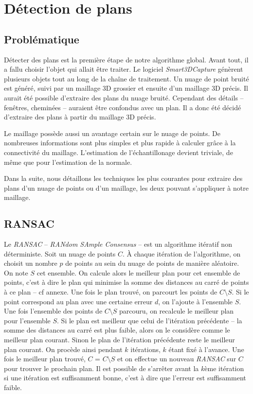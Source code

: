 \documentclass[12pt, twoside]{article}
\let\oldsection\section
\def\section{\cleardoublepage\oldsection}
\begin{document}
\section{Détection de plans}
\subsection{Problématique}
Détecter des plans est la première étape de notre algorithme global. Avant tout, il a fallu choisir l'objet qui allait être traiter. Le logiciel \textit{Smart3DCapture} génèrent plusieurs objets tout au long de la chaîne de traitement. Un nuage de point bruité est généré, suivi par un maillage 3D grossier et ensuite d'un maillage 3D précis. Il aurait été possible d'extraire des plans du nuage bruité. Cependant des détails -- fenêtres, cheminées -- auraient être confondus avec un plan. Il a donc été décidé d'extraire des plans à partir du maillage 3D précis.

Le maillage possède aussi un avantage certain sur le nuage de points. De nombreuses informations sont plus simples et plus rapide à calculer grâce à la connectivité du maillage. L'estimation de l'échantillonage devient triviale, de même que pour l'estimation de la normale.

Dans la suite, nous détaillons les techniques les plus courantes pour extraire des plans d'un nuage de points ou d'un maillage, les deux pouvant s'appliquer à notre maillage.

\subsection{RANSAC}
Le \textit{RANSAC} -- \textit{RANdom SAmple Consensus} -- est un algorithme itératif non déterministe. Soit un nuage de points $C$. À chaque itération de l’algorithme, on choisit un nombre $p$ de points au sein du nuage de points de manière aléatoire. On note $S$ cet ensemble. On calcule alors le meilleur plan pour cet ensemble de points, c’est à dire le plan qui minimise la somme des distances au carré de points à ce plan -- cf annexe. Une fois le plan trouvé, on parcourt les points de $C\setminus S$. Si le point correspond au plan avec une certaine erreur $d$, on l’ajoute à l’ensemble $S$. Une fois l’ensemble des points de $C\setminus S$ parcouru, on recalcule le meilleur plan pour l’ensemble $S$. Si le plan est meilleur que celui de l’itération précédente -- la somme des distances au carré est plus faible, alors on le considère comme le meilleur plan courant. Sinon le plan de l’itération précédente reste le meilleur plan courant. On procède ainsi pendant $k$ itérations, $k$ étant fixé à l’avance. Une fois le meilleur plan trouvé, $C$ = $C\setminus S$ et on effectue un nouveau \textit{RANSAC} sur $C$ pour trouver le prochain plan. Il est possible de s’arrêter avant la $k$ème itération si une itération est suffisamment bonne, c’est à dire que l’erreur est suffisamment faible.
\end{document}
